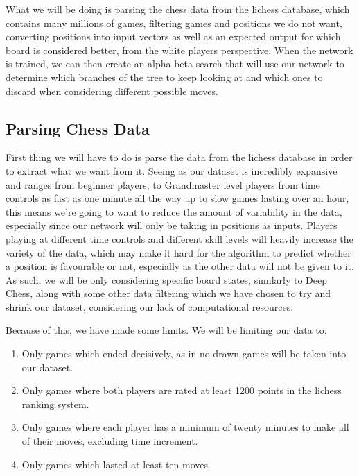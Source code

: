 \documentclass[12pt]{article}
\begin{document}
    What we will be doing is parsing the chess data from the lichess database, which contains many millions of games, filtering games and positions we do not want, converting positions into input vectors as well as an expected output for which board is considered better, from the white players perspective. When the network is trained, we can then create an alpha-beta search that will use our network to determine which branches of the tree to keep looking at and which ones to discard when considering different possible moves.

    \subsection{Parsing Chess Data}
    
    First thing we will have to do is parse the data from the lichess database in order to extract what we want from it. Seeing as our dataset is incredibly expansive and ranges from beginner players, to Grandmaster level players from time controls as fast as one minute all the way up to slow games lasting over an hour, this means we're going to want to reduce the amount of variability in the data, especially since our network will only be taking in positions as inputs. Players playing at different time controls and different skill levels will heavily increase the variety of the data, which may make it hard for the algorithm to predict whether a position is favourable or not, especially as the other data will not be given to it. As such, we will be only considering specific board states, similarly to Deep Chess, along with some other data filtering which we have chosen to try and shrink our dataset, considering our lack of computational resources.

    Because of this, we have made some limits. We will be limiting our data to:
    \begin{enumerate}
        \item Only games which ended decisively, as in no drawn games will be taken into our dataset. 
        \item Only games where both players are rated at least 1200 points in the lichess ranking system.
        \item Only games where each player has a minimum of twenty minutes to make all of their moves, excluding time increment.
        \item Only games which lasted at least ten moves.
    \end{enumerate}
\end{document}
